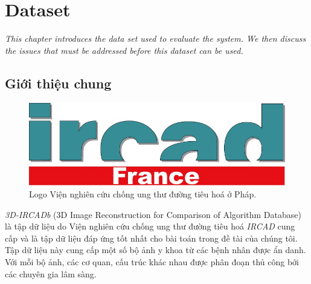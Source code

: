 \chapter{Dataset}
\label{chap:dataset}
	\textit{This chapter introduces the data set used to evaluate the system. We then discuss the issues that must be addressed before this dataset can be used.}
\minitoc

\section{Giới thiệu chung}
\label{sec:gioi_thieu_chung}
	\begin{figure}[h!]
		\centering
		\includegraphics[width=.4\textwidth]{figures/ircad_logo}
		\caption{Logo Viện nghiên cứu chống ung thư đường tiêu hoá ở Pháp.}
		\label{fig:3d_ircadb_01_visualize}
	\end{figure}
	\textit{3D-IRCADb} (3D Image Reconstruction for Comparison of Algorithm Database) là tập dữ liệu do Viện nghiên cứu chống ung thư đường tiêu hoá \textit{IRCAD} cung cấp và là tập dữ liệu đáp ứng tốt nhất cho bài toán trong đề tài của chúng tôi. Tập dữ liệu này cung cấp một số bộ ảnh y khoa từ các bệnh nhân được ẩn danh. Với mỗi bộ ảnh, các cơ quan, cấu trúc khác nhau được phân đoạn thủ công bởi các chuyên gia lâm sàng.
	
